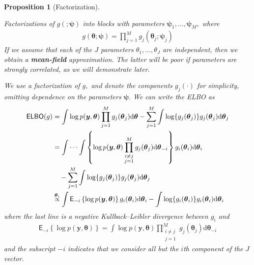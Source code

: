 \documentclass[
  11pt,
  letterpaper,
]{scrbook}
\theoremstyle{definition}
\theoremstyle{plain}
\newtheorem{proposition}{Proposition}[chapter]
\theoremstyle{plain}
\theoremstyle{plain}
\theoremstyle{definition}
\theoremstyle{definition}
\theoremstyle{plain}
\newtheorem{proposition}{Proposition}[chapter]
\theoremstyle{plain}
\theoremstyle{remark}
\begin{document}
\begin{proposition}[Factorization]\protect\hypertarget{prp-factorization}{}\label{prp-factorization}

Factorizations of \(g(;\boldsymbol{\psi})\) into blocks with parameters
\(\boldsymbol{\psi}_1, \ldots, \boldsymbol{\psi}_M,\) where
\begin{align*}
g(\boldsymbol{\theta}; \boldsymbol{\psi}) = \prod_{j=1}^M g_j(\boldsymbol{\theta}_j; \boldsymbol{\psi}_j)
\end{align*} If we assume that each of the \(J\) parameters
\(\theta_1, \ldots, \theta_J\) are independent, then we obtain a
\textbf{mean-field} approximation. The latter will be poor if parameters
are strongly correlated, as we will demonstrate later.

We use a factorization of \(g,\) and denote the components
\(g_j(\cdot)\) for simplicity, omitting dependence on the parameters
\(\boldsymbol{\psi}.\) We can write the ELBO as \begin{align*}
\mathsf{ELBO}(g) &= \int \log p(\boldsymbol{y}, \boldsymbol{\theta}) \prod_{j=1}^M g_j(\boldsymbol{\theta}_j)\mathrm{d} \boldsymbol{\theta} - \sum_{j=1}^M \int \log \{ g_j(\boldsymbol{\theta}_j) \} g_j(\boldsymbol{\theta}_j) \mathrm{d}  \boldsymbol{\theta}_j
 \\& = \idotsint \left\{\log p(\boldsymbol{y}, \boldsymbol{\theta}) \prod_{\substack{i \neq j \\j=1}}^M g_j(\boldsymbol{\theta}_j)\mathrm{d} \boldsymbol{\theta}_{-i}\right\}  g_i(\boldsymbol{\theta}_i) \mathrm{d} \boldsymbol{\theta}_i \\& \quad - \sum_{j=1}^M \int \log \{ g_j(\boldsymbol{\theta}_j) \} g_j(\boldsymbol{\theta}_j) \mathrm{d}  \boldsymbol{\theta}_j
 \\& \stackrel{\boldsymbol{\theta}_i}{\propto} \int \mathsf{E}_{-i}\left\{\log p(\boldsymbol{y}, \boldsymbol{\theta})\right\} g_i(\boldsymbol{\theta}_i) \mathrm{d} \boldsymbol{\theta}_i - \int \log \{ g_i(\boldsymbol{\theta}_i) \} g_i(\boldsymbol{\theta}_i) \mathrm{d} \boldsymbol{\theta}_i
\end{align*} where the last line is a negative Kullback--Leibler
divergence between \(g_i\) and \begin{align*}
 \mathsf{E}_{-i}\left\{\log p(\boldsymbol{y}, \boldsymbol{\theta})\right\} = \int \log p(\boldsymbol{y}, \boldsymbol{\theta}) \prod_{\substack{i \neq j \\j=1}}^M g_j(\boldsymbol{\theta}_j)\mathrm{d} \boldsymbol{\theta}_{-i}
\end{align*} and the subscript \(-i\) indicates that we consider all but
the \(i\)th component of the \(J\) vector.


\end{proposition}
\end{document}
